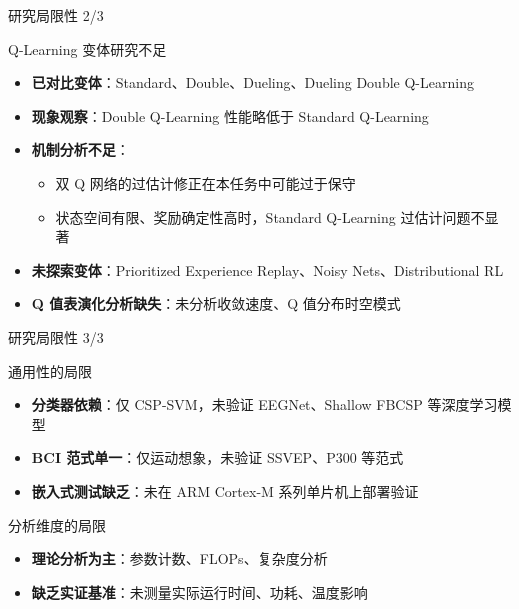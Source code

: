 {\begin{frame}{研究局限性 2/3}
    \begin{block}{Q-Learning 变体研究不足}
        \begin{itemize}
            \item \textbf{已对比变体}：Standard、Double、Dueling、Dueling Double Q-Learning
            \item \textbf{现象观察}：Double Q-Learning 性能略低于 Standard Q-Learning
            \item \textbf{机制分析不足}：
            \begin{itemize}
                \item 双 Q 网络的过估计修正在本任务中可能过于保守
                \item 状态空间有限、奖励确定性高时，Standard Q-Learning 过估计问题不显著
            \end{itemize}
            \item \textbf{未探索变体}：Prioritized Experience Replay、Noisy Nets、Distributional RL
            \item \textbf{Q 值表演化分析缺失}：未分析收敛速度、Q 值分布时空模式
        \end{itemize}
    \end{block}
\end{frame}

\begin{frame}{研究局限性 3/3}
    \begin{block}{通用性的局限}
        \begin{itemize}
            \item \textbf{分类器依赖}：仅 CSP-SVM，未验证 EEGNet、Shallow FBCSP 等深度学习模型
            \item \textbf{BCI 范式单一}：仅运动想象，未验证 SSVEP、P300 等范式
            \item \textbf{嵌入式测试缺乏}：未在 ARM Cortex-M 系列单片机上部署验证
        \end{itemize}
    \end{block}

    \vspace{0.3cm}
    \begin{block}{分析维度的局限}
        \begin{itemize}
            \item \textbf{理论分析为主}：参数计数、FLOPs、复杂度分析
            \item \textbf{缺乏实证基准}：未测量实际运行时间、功耗、温度影响
        \end{itemize}
    \end{block}
\end{frame}

}
